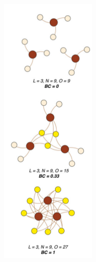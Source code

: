 \documentclass{beamer} \usepackage{amsmath,amsthm}
\begin{document}
\begin{frame}
\begin{columns}
\begin{column}{0.5\textwidth}
\begin{center}
        \includegraphics[height=0.8\textheight,width=\textwidth,keepaspectratio=true]{figure/bc}

        \tiny{}
      \end{center}
    \end{column}
  \end{columns}
\end{frame}
\end{document}
